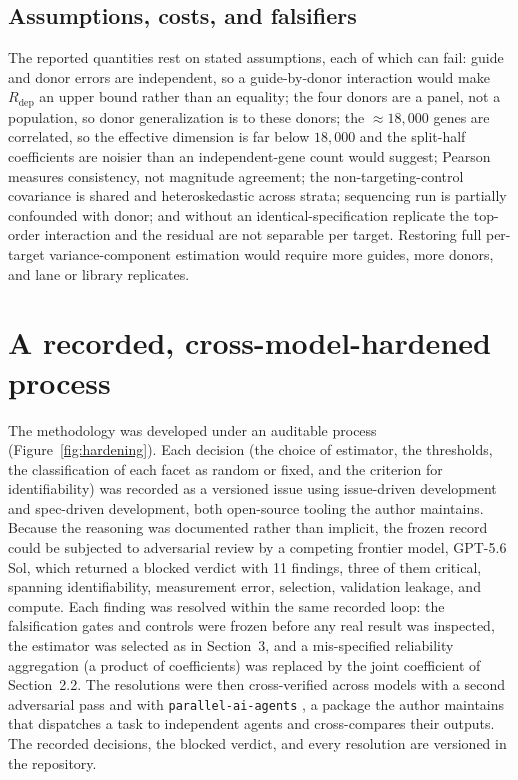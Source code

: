 \documentclass[11pt]{article}
\begin{document}
\subsection{Assumptions, costs, and falsifiers}

The reported quantities rest on stated assumptions, each of which can fail: guide
and donor errors are independent, so a guide-by-donor interaction would make
$R_{\mathrm{dep}}$ an upper bound rather than an equality; the four donors are a
panel, not a population, so donor generalization is to these donors; the
$\approx 18{,}000$ genes are correlated, so the effective dimension is far below
$18{,}000$ and the split-half coefficients are noisier than an
independent-gene count would suggest; Pearson measures consistency, not magnitude
agreement; the non-targeting-control covariance is shared and heteroskedastic across
strata; sequencing run is partially confounded with donor; and without an
identical-specification replicate the top-order interaction and the residual are not
separable per target. Restoring full per-target variance-component estimation would
require more guides, more donors, and lane or library replicates.

\section{A recorded, cross-model-hardened process}

The methodology was developed under an auditable process
(Figure~\ref{fig:hardening}). Each decision (the choice of estimator, the
thresholds, the classification of each facet as random or fixed, and the criterion
for identifiability) was recorded as a versioned issue using issue-driven
development \parencite{idd} and spec-driven development, both open-source tooling
the author maintains. Because the reasoning was documented rather than implicit,
the frozen record could be subjected to adversarial review by a competing frontier
model, GPT-5.6 Sol, which returned a blocked verdict with 11 findings, three of
them critical, spanning identifiability, measurement error, selection, validation
leakage, and compute. Each finding was resolved within the same recorded loop:
the falsification gates and controls were frozen before any real result was
inspected, the estimator was selected as in Section~3, and a mis-specified
reliability aggregation (a product of coefficients) was replaced by the joint
coefficient of Section~2.2. The resolutions were then cross-verified across models
with a second adversarial pass and with \texttt{parallel-ai-agents}
\parencite{parallelaiagents}, a package the author maintains that dispatches a task
to independent agents and cross-compares their outputs. The recorded decisions, the
blocked verdict, and every resolution are versioned in the repository.
\end{document}
